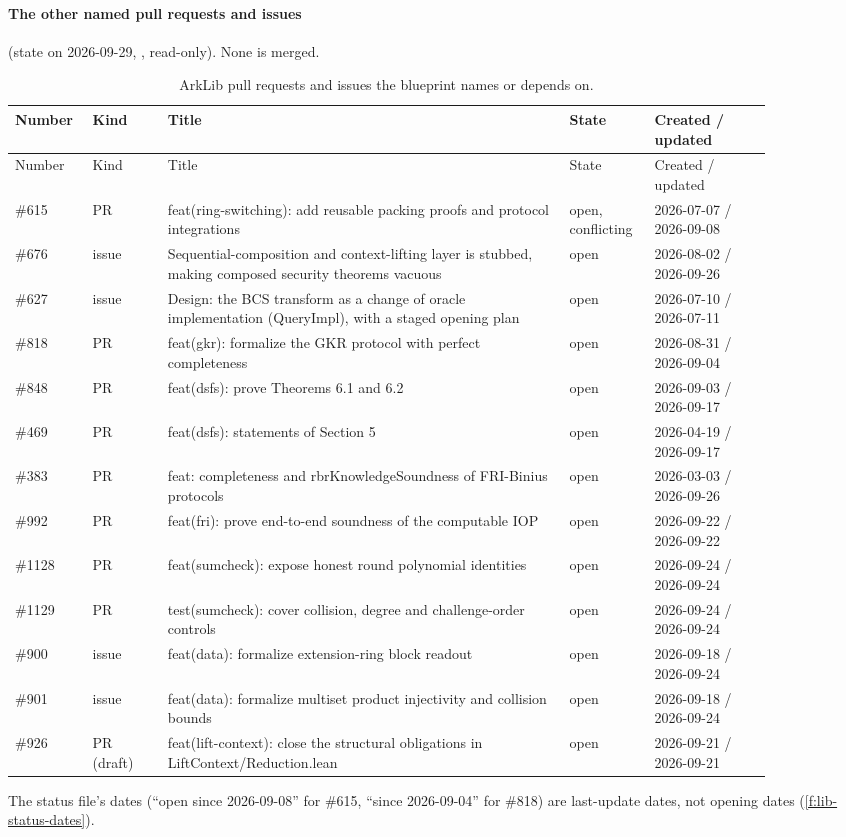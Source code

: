 \paragraph{The other named pull requests and issues} (state on 2026-09-29, ,
read-only). None is merged.

{\footnotesize
\begin{longtable}{@{}p{0.07\linewidth}p{0.09\linewidth}p{0.48\linewidth}p{0.10\linewidth}p{0.14\linewidth}@{}}
\caption{ArkLib pull requests and issues the blueprint names or depends on.}\label{tab:gen-lib-ark-prs}\\
\toprule
Number & Kind & Title & State & Created / updated \\
\midrule
\endfirsthead
\toprule
Number & Kind & Title & State & Created / updated \\
\midrule
\endhead
\bottomrule
\endfoot
\#615 & PR & feat(ring-switching): add reusable packing proofs and protocol integrations & open,
  conflicting & 2026-07-07 / 2026-09-08 \\
\#676 & issue & Sequential-composition and context-lifting layer is stubbed, making composed
  security theorems vacuous & open & 2026-08-02 / 2026-09-26 \\
\#627 & issue & Design: the BCS transform as a change of oracle implementation (QueryImpl), with a
  staged opening plan & open & 2026-07-10 / 2026-07-11 \\
\#818 & PR & feat(gkr): formalize the GKR protocol with perfect completeness & open &
  2026-08-31 / 2026-09-04 \\
\#848 & PR & feat(dsfs): prove Theorems 6.1 and 6.2 & open & 2026-09-03 / 2026-09-17 \\
\#469 & PR & feat(dsfs): statements of Section 5 & open & 2026-04-19 / 2026-09-17 \\
\#383 & PR & feat: completeness and rbrKnowledgeSoundness of FRI-Binius protocols & open &
  2026-03-03 / 2026-09-26 \\
\#992 & PR & feat(fri): prove end-to-end soundness of the computable IOP & open &
  2026-09-22 / 2026-09-22 \\
\#1128 & PR & feat(sumcheck): expose honest round polynomial identities & open &
  2026-09-24 / 2026-09-24 \\
\#1129 & PR & test(sumcheck): cover collision, degree and challenge-order controls & open &
  2026-09-24 / 2026-09-24 \\
\#900 & issue & feat(data): formalize extension-ring block readout & open &
  2026-09-18 / 2026-09-24 \\
\#901 & issue & feat(data): formalize multiset product injectivity and collision bounds & open &
  2026-09-18 / 2026-09-24 \\
\#926 & PR (draft) & feat(lift-context): close the structural obligations in
  LiftContext/Reduction.lean & open & 2026-09-21 / 2026-09-21 \\
\end{longtable}}

The status file's dates (\enquote{open since 2026-09-08} for \#615, \enquote{since 2026-09-04}
for \#818) are last-update dates, not opening dates (\cref{f:lib-status-dates}).

\par\endgroup